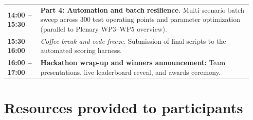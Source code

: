 \documentclass[11pt,a4paper]{article}
\begin{document}
\begin{table}[H]
\begin{tabularx}{\textwidth}{lX}
    \textbf{14:00 -- 15:30}     & \textbf{Part 4: Automation and batch resilience.} Multi-scenario batch sweep across 300 test operating points and parameter optimization (parallel to Plenary WP3--WP5 overview).                                           \\
    \textbf{15:30 -- 16:00}     & \textit{\color{tgpetrol}Coffee break and code freeze.} Submission of final scripts to the automated scoring harness.                                                                                                        \\
    \textbf{16:00 -- 17:00}     & \textbf{Hackathon wrap-up and winners announcement:} Team presentations, live leaderboard reveal, and awards ceremony.                                                                                                      \\
    \bottomrule
  \end{tabularx}
\end{table}

\section{Resources provided to participants}
\end{document}
